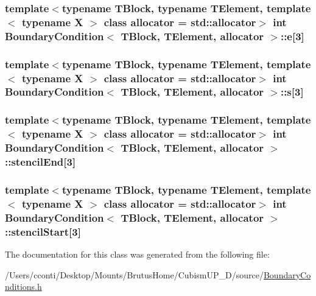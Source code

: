 \subsubsection[{e}]{\setlength{\rightskip}{0pt plus 5cm}template$<$typename T\+Block, typename T\+Element, template$<$ typename X $>$ class allocator = std\+::allocator$>$ int {\bf Boundary\+Condition}$<$ T\+Block, T\+Element, allocator $>$\+::e\mbox{[}3\mbox{]}\hspace{0.3cm}{\ttfamily [protected]}}\label{class_boundary_condition_a755da05bbc5a09adb17a6f1e5a15f25b}
\hypertarget{class_boundary_condition_a7734cfc6ee1ce3a1dea426ab289a299a}{}
\subsubsection[{s}]{\setlength{\rightskip}{0pt plus 5cm}template$<$typename T\+Block, typename T\+Element, template$<$ typename X $>$ class allocator = std\+::allocator$>$ int {\bf Boundary\+Condition}$<$ T\+Block, T\+Element, allocator $>$\+::s\mbox{[}3\mbox{]}\hspace{0.3cm}{\ttfamily [protected]}}\label{class_boundary_condition_a7734cfc6ee1ce3a1dea426ab289a299a}
\hypertarget{class_boundary_condition_af396b479ba0487ba5c0e45d5b636f09e}{}
\subsubsection[{stencil\+End}]{\setlength{\rightskip}{0pt plus 5cm}template$<$typename T\+Block, typename T\+Element, template$<$ typename X $>$ class allocator = std\+::allocator$>$ int {\bf Boundary\+Condition}$<$ T\+Block, T\+Element, allocator $>$\+::stencil\+End\mbox{[}3\mbox{]}\hspace{0.3cm}{\ttfamily [protected]}}\label{class_boundary_condition_af396b479ba0487ba5c0e45d5b636f09e}
\hypertarget{class_boundary_condition_aed1e3cfd20d69c6084d901c246698fdd}{}
\subsubsection[{stencil\+Start}]{\setlength{\rightskip}{0pt plus 5cm}template$<$typename T\+Block, typename T\+Element, template$<$ typename X $>$ class allocator = std\+::allocator$>$ int {\bf Boundary\+Condition}$<$ T\+Block, T\+Element, allocator $>$\+::stencil\+Start\mbox{[}3\mbox{]}\hspace{0.3cm}{\ttfamily [protected]}}\label{class_boundary_condition_aed1e3cfd20d69c6084d901c246698fdd}


The documentation for this class was generated from the following file\+:\begin{DoxyCompactItemize}
\item 
/\+Users/cconti/\+Desktop/\+Mounts/\+Brutus\+Home/\+Cubism\+U\+P\+\_\+D/source/\hyperlink{_boundary_conditions_8h}{Boundary\+Conditions.\+h}\end{DoxyCompactItemize}
